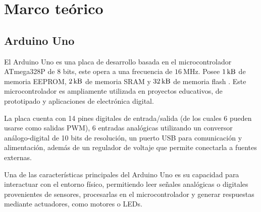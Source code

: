 \section{Marco teórico}
\subsection{Arduino Uno}
El Arduino Uno es una placa de desarrollo basada en el microcontrolador ATmega328P de $8$ bits, este opera a una
frecuencia de $\SI{16}{\mega \hertz}$. Posee $\SI{1}{\kilo \byte}$ de memoria EEPROM, $\SI{2}{\kilo \byte}$ de memoria 
SRAM y $\SI{32}{\kilo \byte}$ de memoria flash \cite{medina-arduino}. Este microcontrolador es ampliamente utilizada en proyectos educativos,
de prototipado y aplicaciones de electrónica digital.


La placa cuenta con 14 pines digitales de entrada/salida 
(de los cuales 6 pueden usarse como salidas PWM),
6 entradas analógicas utilizando un conversor análogo-digital de 10 bits de resolución, 
un puerto USB para comunicación y alimentación, 
además de un regulador de voltaje que permite conectarla a fuentes externas. 


Una de las características principales del Arduino Uno es su capacidad para interactuar con el entorno físico,
permitiendo leer señales analógicas o digitales provenientes de sensores, procesarlas en el microcontrolador 
y generar respuestas mediante actuadores, como motores o LEDs.

